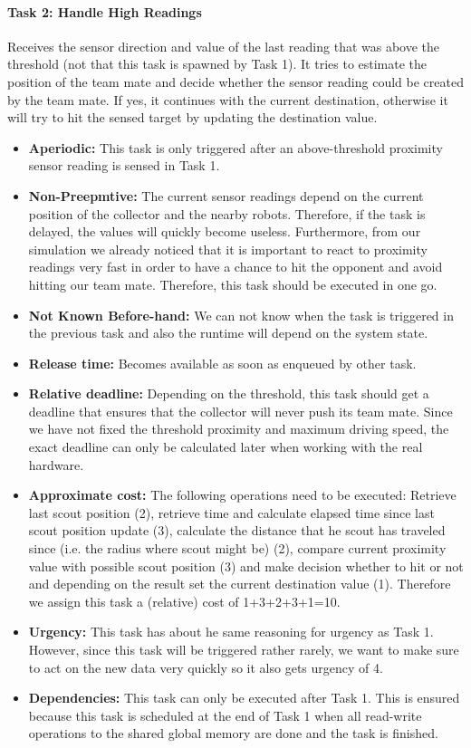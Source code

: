 \documentclass[12pt]{article}
\begin{document}
\paragraph{Task 2: Handle High Readings}
Receives the sensor direction and value of the last reading that was above the threshold (not that this task is spawned by Task 1). It tries to estimate the position of the team mate and decide whether the sensor reading could be created by the team mate. If yes, it continues with the current destination, otherwise it will try to hit the sensed target by updating the destination value.
  	\begin{itemize}
	\item \textbf{Aperiodic:} This task is only triggered after an above-threshold proximity sensor reading is sensed in Task 1. 
	\item \textbf{Non-Preepmtive:} The current sensor readings depend on the current position of the collector and the nearby robots. Therefore, if the task is delayed, the values will quickly become useless. Furthermore, from our simulation we already noticed that it is important to react to proximity readings very fast in order to have a chance to hit the opponent and avoid hitting our team mate. Therefore, this task should be executed in one go.
  	\item \textbf{Not Known Before-hand:} We can not know when the task is triggered in the previous task and also the runtime will depend on the system state.
  	\item \textbf{Release time:} Becomes available as soon as enqueued by other task.
  	\item \textbf{Relative deadline:} Depending on the threshold, this task should get a deadline that ensures that the collector will never push its team mate. Since we have not fixed the threshold proximity and maximum driving speed, the exact deadline can only be calculated later when working with the real hardware.
  	\item \textbf{Approximate cost:} The following operations need to be executed: Retrieve last scout position (2), retrieve time and calculate elapsed time since last scout position update (3), calculate the distance that he scout has traveled since (i.e. the radius where scout might be) (2), compare current proximity value with possible scout position (3) and make decision whether to hit or not and depending on the result set the current destination value (1). Therefore we assign this task a (relative) cost of 1+3+2+3+1=10. 
  	\item \textbf{Urgency:} This task has about he same reasoning for urgency as Task 1. However, since this task will be triggered rather rarely, we want to make sure to act on the new data very quickly so it also gets urgency of 4.
  	\item \textbf{Dependencies:} This task can only be executed after Task 1. This is ensured because this task is scheduled at the end of Task 1 when all read-write operations to the shared global memory are done and the task is finished.
   	\end{itemize} 
   	
\end{document}
